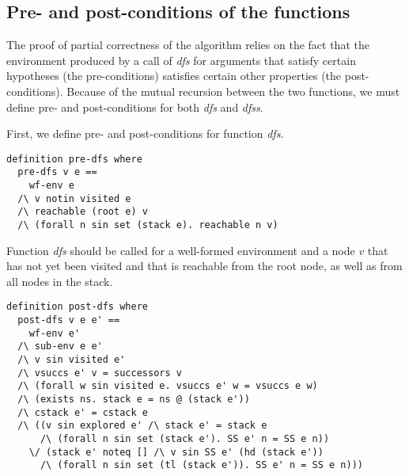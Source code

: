 \documentclass[sigplan,10pt,anonymous,review]{acmart}
\newcommand{\prog}[1]{\textit{#1}}
\begin{document}
\subsection{Pre- and post-conditions of the functions}
\label{sec:pre-post}

The proof of partial correctness of the algorithm relies on the fact that the environment produced by a call of \prog{dfs} for arguments that satisfy certain hypotheses (the pre-conditions) satisfies certain other properties (the post-conditions). Because of the mutual recursion between the two functions, we must define pre- and post-conditions for both \prog{dfs} and \prog{dfss}.

First, we define pre- and post-conditions for function \prog{dfs}.

\begin{small}
\begin{lstlisting}[language=isabelle]
definition pre-dfs where 
  pre-dfs v e ==
    wf-env e
  /\ v notin visited e
  /\ reachable (root e) v
  /\ (forall n sin set (stack e). reachable n v)
\end{lstlisting}
\end{small}

Function \prog{dfs} should be called for a well-formed environment and a node $v$ that has not yet been visited and that is reachable from the root node, as well as from all nodes in the stack.

\begin{small}
\begin{lstlisting}[language=isabelle]
definition post-dfs where 
  post-dfs v e e' ==
    wf-env e'
  /\ sub-env e e'
  /\ v sin visited e'
  /\ vsuccs e' v = successors v
  /\ (forall w sin visited e. vsuccs e' w = vsuccs e w)
  /\ (exists ns. stack e = ns @ (stack e'))
  /\ cstack e' = cstack e
  /\ ((v sin explored e' /\ stack e' = stack e 
      /\ (forall n sin set (stack e'). SS e' n = SS e n)) 
    \/ (stack e' noteq [] /\ v sin SS e' (hd (stack e')) 
      /\ (forall n sin set (tl (stack e')). SS e' n = SS e n)))
\end{lstlisting}
\end{small}
\end{document}
